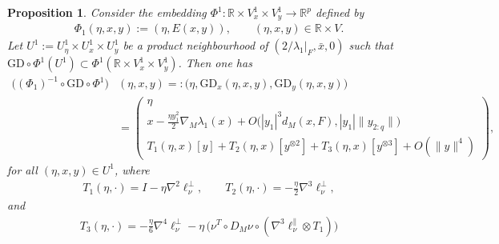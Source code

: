 \documentclass{article}
\newcommand{\RB}{\mathbb{R}}
\newcommand{\GD}{\mathrm{GD}}
\theoremstyle{plain}
\newtheorem{proposition}[theorem]{Proposition}
\theoremstyle{definition}
\theoremstyle{remark}
\begin{document}
\begin{proposition}\label{prop:tubularcoords}
    Consider the embedding $\Phi^1:\RB\times V^1_x\times V^1_y\rightarrow\RB^p$ defined by 
    \begin{align}
        \Phi_1(\eta,x,y):=(\eta,E(x,y)),\qquad (\eta,x,y)\in\RB\times V.
    \end{align}
    Let $U^1:=U^1_{\eta}\times U^1_x\times U^1_y$ be a product neighbourhood of $(2/\lambda_1|_F,\bar{x},0)$ such that $\GD\circ \Phi^1(U^1)\subset \Phi^1(\RB\times V^1_x\times V^1_y)$. Then one has
    \begin{align}
    \big((\Phi_1)^{-1}\circ\GD\circ \Phi^1\big)&(\eta,x,y) =: \big(\eta, \GD_x(\eta,x,y),\GD_y(\eta,x,y)\big)\\ &= \begin{pmatrix}\eta\\
        x - \frac{\eta y_1^2}{2}\nabla_M\lambda_1(x) + O\big(|y_1|^3d_M(x,F),|y_1|\|y_{2:q}\|\big)\\T_1(\eta,x)[y]+T_2(\eta,x)[ y^{\otimes 2}] + T_3(\eta,x)[ y^{\otimes 3}] + O(\|y\|^4)
    \end{pmatrix},
    \end{align}
    for all $(\eta,x,y)\in U^1$, where
    \begin{align}
    T_1(\eta,\cdot) = I-\eta\nabla^2\ell_{\nu}^{\perp},\qquad T_2(\eta,\cdot) = -\frac{\eta}{2}\nabla^3\ell_{\nu}^{\perp},
    \end{align}
    and
    \begin{align}
    T_3(\eta,\cdot) = -\frac{\eta}{6}\nabla^4\ell_{\nu}^{\perp}-\eta\,\big(\nu^T\circ D_M\nu\circ(\nabla^3\ell_{\nu}^{\parallel}\otimes T_1)\big)
    \end{align}
\end{proposition}
\end{document}
